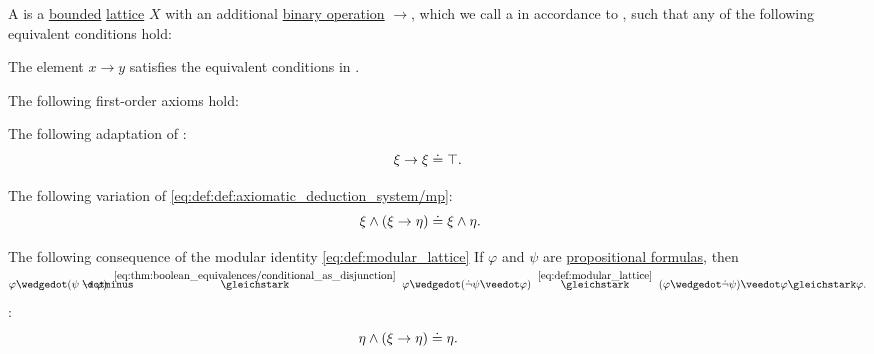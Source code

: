 \begin{definition}\label{def:heyting_algebra}
  A  is a \hyperref[def:extremal_points/bounds]{bounded} \hyperref[def:lattice]{lattice} \( X \) with an additional \hyperref[def:binary_operation]{binary operation} \( {\rightarrow} \), which we call a  in accordance to \cite[51]{Birkhoff1967}, such that any of the following equivalent conditions hold:
  \begin{thmenum}[series=def:heyting_algebra]
     The element \( x \rightarrow y \) satisfies the equivalent conditions in .

     The following first-order axioms hold:
    \begin{thmenum}
       The following adaptation of :
      \begin{equation}\label{eq:def:heyting_algebra/axioms/self}
        \mathllap{\xi \rightarrow \xi} \syneq \mathrlap{\top.}
      \end{equation}

       The following variation of \eqref{eq:def:def:axiomatic_deduction_system/mp}:
      \begin{equation}\label{eq:def:heyting_algebra/axioms/modus_ponens}
        \mathllap{\xi \wedge (\xi \rightarrow \eta)} \syneq \mathrlap{\xi \wedge \eta.}
      \end{equation}

       The following consequence of the modular identity \eqref{eq:def:modular_lattice}\fnote
        {
          If \( \varphi \) and \( \psi \) are \hyperref[def:propositional_syntax/formula]{propositional formulas}, then
          \begin{equation*}
            \varphi \synwedge (\psi \synimplies \varphi)
            \reloset {\eqref{eq:thm:boolean_equivalences/conditional_as_disjunction}} \gleichstark
            \varphi \synwedge (\synneg \psi \synvee \varphi)
            \reloset {\eqref{eq:def:modular_lattice}} \gleichstark
            (\varphi \synwedge \synneg \psi) \synvee \varphi
            \gleichstark
            \varphi.
          \end{equation*}
        }:
      \begin{equation}\label{eq:def:heyting_algebra/axioms/modular}
        \mathllap{\eta \wedge (\xi \rightarrow \eta)} \syneq \mathrlap{\eta.}
      \end{equation}


\end{thmenum}
\end{thmenum}
\end{definition}
